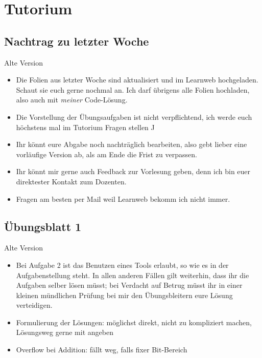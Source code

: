 \documentclass[aspectratio=169,usepdftitle=true,11pt,ngerman,t]{beamer}
\subtitle{Tutorium 1}
\date{18. Oktober 2024}
\begin{document}
\section[Hier meine niedergeschriebenen Notizen aus dem Tutorium]{Tutorium}

\subsection{Nachtrag zu letzter Woche}

\begin{frame}{Alte Version}
    \begin{itemize}
        \item Die Folien aus letzter Woche sind aktualisiert und im Learnweb hochgeladen. Schaut sie euch gerne nochmal an. Ich darf übrigens alle Folien hochladen, also auch mit \textit{meiner} Code-Lösung.
        \item Die Vorstellung der Übungsaufgaben ist nicht verpflichtend, ich werde euch höchstens mal im Tutorium Fragen stellen ^^
        \item Ihr könnt eure Abgabe noch nachträglich bearbeiten, also gebt lieber eine vorläufige Version ab, als am Ende die Frist zu verpassen.
        \item Ihr könnt mir gerne auch Feedback zur Vorlesung geben, denn ich bin euer direktester Kontakt zum Dozenten.
        \item Fragen am besten per Mail weil Learnweb bekomm ich nicht immer.        
    \end{itemize}
\end{frame}

\subsection{Übungsblatt 1}

\begin{frame}{Alte Version}
    \begin{itemize}
        \item Bei Aufgabe 2 ist das Benutzen eines Tools erlaubt, so wie es in der Aufgabenstellung steht. In allen anderen Fällen gilt weiterhin, dass ihr die Aufgaben selber lösen müsst; bei Verdacht auf Betrug müsst ihr in einer kleinen mündlichen Prüfung bei mir den Übungsbleitern eure Lösung verteidigen.
        \item Formulierung der Lösungen: möglichst direkt, nicht zu kompliziert machen, Lösungsweg gerne mit angeben
        \item Overflow bei Addition: fällt weg, falls fixer Bit-Bereich
    \end{itemize}
\end{frame}
\end{document}
